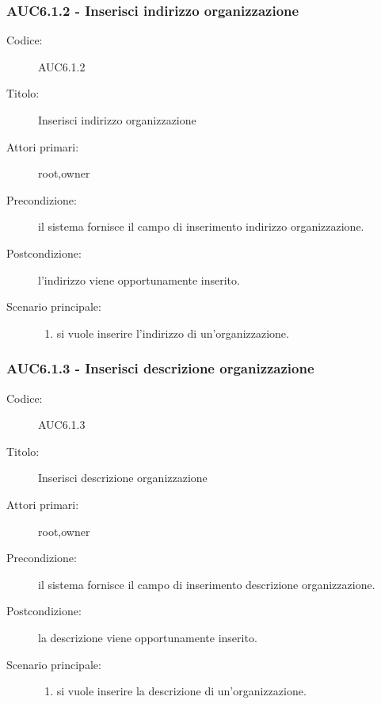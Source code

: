 \documentclass[casi-duso]{subfiles}
\begin{document}
  \subsubsection{AUC6.1.2 - Inserisci indirizzo organizzazione}%
  \label{subsub:AUC6.1.2}
  \begin{description}
    \item[Codice:] AUC6.1.2
    \item[Titolo:] Inserisci indirizzo organizzazione
    \item[Attori primari:] root,owner
    \item[Precondizione:] il sistema fornisce il campo di inserimento indirizzo organizzazione.
    \item[Postcondizione:] l'indirizzo viene opportunamente inserito.
    \item[Scenario principale:]
    \begin{enumerate}
      \item si vuole inserire l'indirizzo di un'organizzazione.
    \end{enumerate}
  \end{description}
  
  \subsubsection{AUC6.1.3 - Inserisci descrizione organizzazione}%
  \label{subsub:AUC6.1.3}
  \begin{description}
    \item[Codice:] AUC6.1.3
    \item[Titolo:] Inserisci descrizione organizzazione
    \item[Attori primari:] root,owner
    \item[Precondizione:] il sistema fornisce il campo di inserimento descrizione organizzazione.
    \item[Postcondizione:] la descrizione viene opportunamente inserito.
    \item[Scenario principale:]
    \begin{enumerate}
      \item si vuole inserire la descrizione di un'organizzazione.
    \end{enumerate}
  \end{description}
\end{document}
